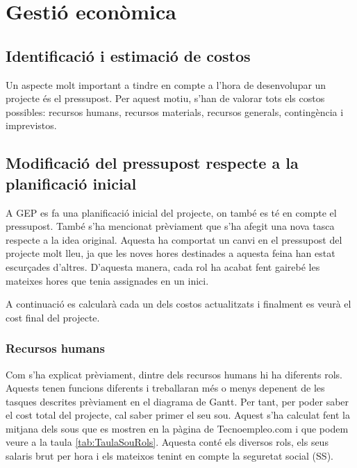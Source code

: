 \documentclass[a4paper]{article}
\begin{document}
\newpage
\section{Gestió econòmica}
\subsection{Identificació i estimació de costos}
Un aspecte molt important a tindre en compte a l'hora de desenvolupar un projecte és el pressupost. Per aquest motiu, s'han de valorar tots els costos possibles: recursos humans, recursos materials, recursos generals, contingència i imprevistos. 

\subsection{Modificació del pressupost respecte a la planificació inicial}
A GEP es fa una planificació inicial del projecte, on també es té en compte el pressupost. També s'ha mencionat prèviament que s'ha afegit una nova tasca respecte a la idea original. Aquesta ha comportat un canvi en el pressupost del projecte molt lleu, ja que les noves hores destinades a aquesta feina han estat escurçades d'altres. D'aquesta manera, cada rol ha acabat fent gairebé les mateixes hores que tenia assignades en un inici.

A continuació es calcularà cada un dels costos actualitzats i finalment es veurà el cost final del projecte.

\subsubsection{Recursos humans}
Com s'ha explicat prèviament, dintre dels recursos humans hi ha diferents rols. Aquests tenen funcions diferents i treballaran més o menys depenent de les tasques descrites prèviament en el diagrama de Gantt. Per tant, per poder saber el cost total del projecte, cal saber primer el seu sou. Aquest s'ha calculat fent la  mitjana dels sous que es mostren en la pàgina de Tecnoempleo.com \cite{tecnoEmpleo} i que podem veure a la taula \ref{tab:TaulaSouRols}. Aquesta conté els diversos rols, els seus salaris brut per hora i els mateixos tenint en compte la seguretat social (SS). 
\end{document}
